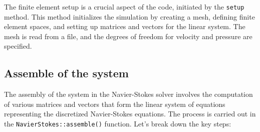 \documentclass{article}
\begin{document}
The finite element setup is a crucial aspect of the code, initiated by the \texttt{setup} method. This method initializes the simulation by creating a mesh, defining finite element spaces, and setting up matrices and vectors for the linear system. The mesh is read from a file, and the degrees of freedom for velocity and pressure are specified.

\subsection{Assemble of the system}

The assembly of the system in the Navier-Stokes solver involves the computation of various matrices and vectors that form the linear system of equations representing the discretized Navier-Stokes equations. The process is carried out in the \texttt{NavierStokes::assemble()} function. Let's break down the key steps:
\end{document}
